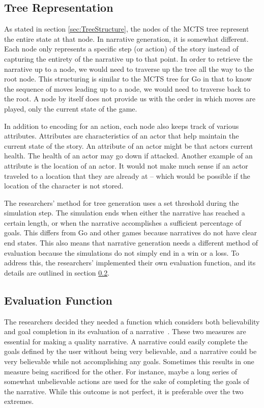 \documentclass{sig-alternate}
\begin{document}
\subsection{Tree Representation}
As stated in section \ref{sec:TreeStructure}, the nodes of the MCTS tree represent the entire state at that node. In narrative generation, it is somewhat different. Each node only represents a specific step (or action) of the story instead of capturing the entirety of the narrative up to that point. In order to retrieve the narrative up to a node, we would need to traverse up the tree all the way to the root node. This structuring is similar to the MCTS tree for Go in that to know the sequence of moves leading up to a node, we would need to traverse back to the root. A node by itself does not provide us with the order in which moves are played, only the current state of the game.

In addition to encoding for an action, each node also keeps track of various attributes. Attributes are characteristics of an actor that help maintain the current state of the story. An attribute of an actor might be that actors current health. The health of an actor may go down if attacked. Another example of an attribute is the location of an actor. It would not make much sense if an actor traveled to a location that they are already at -- which would be possible if the location of the character is not stored.

The researchers' method for tree generation uses a set threshold during the simulation step. The simulation ends when either the narrative has reached a certain length, or when the narrative accomplishes a sufficient percentage of goals. This differs from Go and other games because narratives do not have clear end states. This also means that narrative generation needs a different method of evaluation because the simulations do not simply end in a win or a loss. To address this, the researchers' implemented their own evaluation function, and its details are outlined in section \ref{sec:EvalFunction}. 

\subsection{Evaluation Function}\label{sec:EvalFunction}
The researchers decided they needed a function which considers both believability and goal completion in its evaluation of a narrative~\cite{Narrative}. These two measures are essential for making a quality narrative. A narrative could easily complete the goals defined by the user without being very believable, and a narrative could be very believable while not accomplishing any goals. Sometimes this results in one measure being sacrificed for the other. For instance, maybe a long series of somewhat unbelievable actions are used for the sake of completing the goals of the narrative. While this outcome is not perfect, it is preferable over the two extremes.
\end{document}
